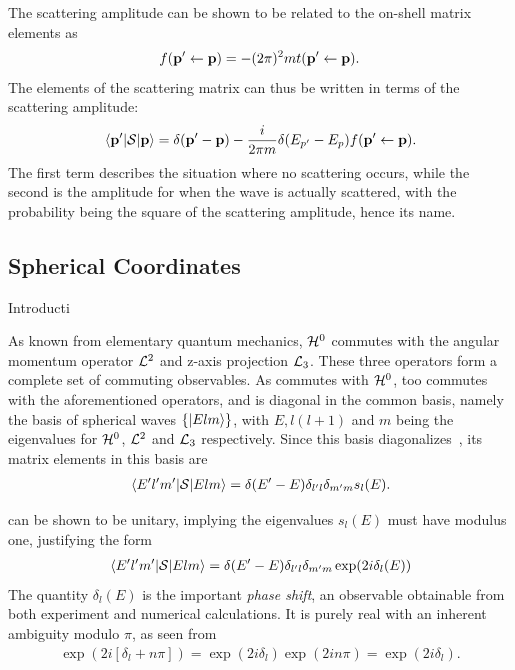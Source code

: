 The scattering amplitude can be shown to be related to the on-shell 
matrix elements as\cite[p.~172]{taylor}
\begin{align*}
  f(\vb{p}^{\prime} \leftarrow \vb{p})= -(2\pi)^{2}mt(\vb{p}^{\prime}\leftarrow\vb{p}).
\end{align*}
The elements of the scattering matrix can thus be written in terms of the
scattering amplitude:
\begin{align*}
  \mel{\vb{p}^{\prime}}{\mathcal{S}}{\vb{p}} = \delta(\vb{p}^{\prime} - \vb{p}) - \frac{i}{2\pi m}\delta(E_{p^{\prime}}-E_{p})f(\vb{p}^{\prime}\leftarrow \vb{p}).
\end{align*}
The first term describes the situation where no scattering occurs, while the
second is the amplitude for when the wave is actually scattered, with the
probability being the square of the scattering amplitude, hence its name.
\subsection{Spherical Coordinates}

Introducti

As known from elementary quantum mechanics, \(\mathcal{H}^{0}\) commutes with the
angular momentum operator \(\mathcal{L}^{2}\) and z-axis projection \(\mathcal{L}_{3}\).
These three operators form a complete set of commuting observables. As 
\mscat{} commutes with \(\mathcal{H}^{0}\), \mscat{} too commutes with the
aforementioned 
operators, and is diagonal in the common basis, namely the basis of spherical waves
\(\left\{ \ket{Elm} \right\}\), with \(E, l(l+1)\) and \(m\) being the
eigenvalues for \(\mathcal{H}^{0}\),  \(\mathcal{L}^{2}\) and  \(\mathcal{L}_{3}\)
respectively. Since this basis diagonalizes\ \mscat{}, its matrix elements in
this basis are
\begin{align*}
  \mel{E^{\prime}l^{\prime}m^{\prime}}{\mathcal{S}}{Elm} = \delta(E^{\prime}-E)\delta_{l^{\prime}l}\delta_{m^{\prime}m}s_{l}(E).
\end{align*}

\mscat{} can be shown to be unitary, implying the eigenvalues \(s_{l}(E)\) must have
modulus one, justifying the form
\begin{align*}
  \mel{E^{\prime}l^{\prime}m^{\prime}}{\mathcal{S}}{Elm} = \delta(E^{\prime}-E)\delta_{l^{\prime}l}\delta_{m^{\prime}m}\exp(2i\delta_{l}(E))
\end{align*}
The quantity \(\delta_{l}(E)\) is the important \textit{phase shift}, an
observable obtainable from both experiment and numerical calculations. It is
purely real with an inherent ambiguity modulo \(\pi\), as seen from
\begin{align*}
  \exp(2i[\delta_{l}+n\pi]) = \exp(2i\delta_{l})\exp(2in\pi) = \exp(2i\delta_{l}).
\end{align*}

